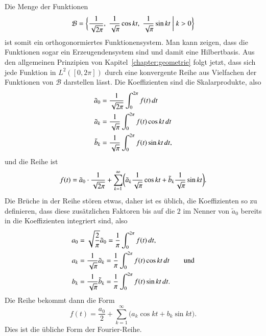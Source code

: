 Die Menge der Funktionen
\[
\mathcal{B}
=
\biggl\{
\biggl.
\frac1{\sqrt{2\pi}}, \;
\frac1{\sqrt{\pi\mathstrut}} \cos kt,\;
\frac1{\sqrt{\pi\mathstrut}} \sin kt
\;
\biggr|
\;
k>0
\biggr\}
\]
ist somit ein orthogonormiertes Funktionensystem.
Man kann zeigen, dass die Funktionen sogar ein Erzeugendensystem sind
und damit eine Hilbertbasis.
Aus den allgemeinen Prinzipien von Kapitel~\ref{chapter:geometrie}
folgt jetzt, dass sich jede Funktion in $L^2([0,2\pi])$
durch eine konvergente Reihe
aus Vielfachen der Funktionen von $\mathcal{B}$ darstellen lässt.
Die Koeffizienten sind die Skalarprodukte, also
\begin{align*}
\tilde{a}_0
&=
\frac{1}{\sqrt{2\pi}}
\int_0^{2\pi} f(t)\,dt
\\
\tilde{a}_k 
&=
\frac{1}{\sqrt{\pi\mathstrut}}
\int_0^{2\pi} f(t) \cos kt\,dt
\\
\tilde{b}_k 
&=
\frac{1}{\sqrt{\pi\mathstrut}}
\int_0^{2\pi} f(t) \sin kt\,dt,
\end{align*}
und die Reihe ist
\[
f(t)
=
\tilde{a}_0 \cdot \frac1{\sqrt{2\pi}}
+
\sum_{k=1}^\infty\biggl(
\tilde{a}_k \frac1{\sqrt{\pi\mathstrut}} \cos kt
+
\tilde{b}_k \frac1{\sqrt{\pi\mathstrut}} \sin kt
\biggr).
\]
Die Brüche in der Reihe stören etwas, daher ist es üblich, die Koeffizienten
so zu definieren, dass diese zusätzlichen Faktoren bis auf die $2$ im
Nenner von $\tilde{a}_0$ bereits in die Koeffizienten integriert sind, also
\begin{align*}
a_0
&=
\sqrt{\frac{2}{\pi}}
\tilde{a}_0
=
\frac1{\pi\mathstrut} \int_0^{2\pi} f(t)\,dt,
\\
a_k
&=
\frac{1}{\sqrt{\pi\mathstrut}} \tilde{a}_k
=
\frac1{\pi\mathstrut} \int_0^{2\pi} f(t) \cos kt\,dt
\qquad\text{und}
\\
b_k
&=
\frac{1}{\sqrt{\pi\mathstrut}} \tilde{b}_k
=
\frac1{\pi\mathstrut} \int_0^{2\pi} f(t) \sin kt\,dt.
\end{align*}
Die Reihe bekommt dann die Form
\[
f(t)
=
\frac{a_0}2
+
\sum_{k=1}^\infty \bigl( a_k \cos kt + b_k \sin kt \bigr).
\]
Dies ist die übliche Form der Fourier-Reihe.

